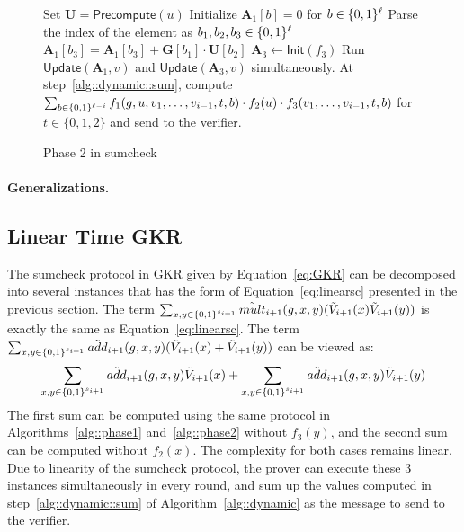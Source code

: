 \begin{figure}[ht!]
	\begin{algorithm}[H]
		\caption{Phase 2 in sumcheck}\label{alg::phase2}
		\begin{algorithmic}[1]
			\State Set $\textbf{U} = \mathsf{Precompute}(u)$
			\State Initialize $\textbf{A}_1[b] = 0$ for $b\in\{0,1\}^\ell$
			\State Parse the index of the element as $b_1,b_2,b_3\in\{0,1\}^\ell$
			\State\label{alg::phase2::init} $\textbf{A}_1[b_3] = \textbf{A}_1[b_3]+ \textbf{G}[b_1]\cdot\textbf{U}[b_2]$
			\EndFor
			\EndProcedure
			\State $\textbf{A}_3\leftarrow\mathsf{Init}(f_3)$
			\State Run $\mathsf{Update}(\textbf{A}_1, v)$ and $\mathsf{Update}(\textbf{A}_3,v)$ simultaneously. At step~\ref{alg::dynamic::sum}, compute $\sum_{b\in\{0,1\}^{\ell-i}}f_1(g,u, v_1, \ldots,v_{i-1}, t, b)\cdot f_2(u)\cdot f_3(v_1, \ldots,v_{i-1}, t, b)$ for $t\in\{0,1,2\}$ and send to the verifier.
			\EndProcedure
		\end{algorithmic}
	\end{algorithm}
\end{figure}


\paragraph{Generalizations.}

\subsection{Linear Time GKR}

The sumcheck protocol in GKR given by Equation~\ref{eq:GKR} can be decomposed into several instances that has the form of Equation~\ref{eq:linearsc} presented in the previous section. The term $\sum_{x,y\in\{0,1\}^{s_{i+1}}}\tilde{mult}_{i+1}(g,x,y)(\tilde{V}_{i+1}(x)\tilde{V}_{i+1}(y))$ is exactly the same as Equation~\ref{eq:linearsc}.  The term $\sum_{x,y\in\{0,1\}^{s_{i+1}}}\tilde{add}_{i+1}(g,x,y)(\tilde{V}_{i+1}(x)+\tilde{V}_{i+1}(y))$ can be viewed as: 
\[
\sum_{x,y\in\{0,1\}^{s_{i+1}}}\tilde{add}_{i+1}(g,x,y)\tilde{V}_{i+1}(x)+\sum_{x,y\in\{0,1\}^{s_{i+1}}}\tilde{add}_{i+1}(g,x,y)\tilde{V}_{i+1}(y)
\]
The first sum can be computed using the same protocol in Algorithms~\ref{alg::phase1} and~\ref{alg::phase2} without $f_3(y)$, and the second sum can be computed without $f_2(x)$. The complexity for both cases remains linear. Due to linearity of the sumcheck protocol, the prover can execute these 3 instances simultaneously in every round, and sum up the values computed in step~\ref{alg::dynamic::sum} of Algorithm~\ref{alg::dynamic} as the message to send to the verifier.



